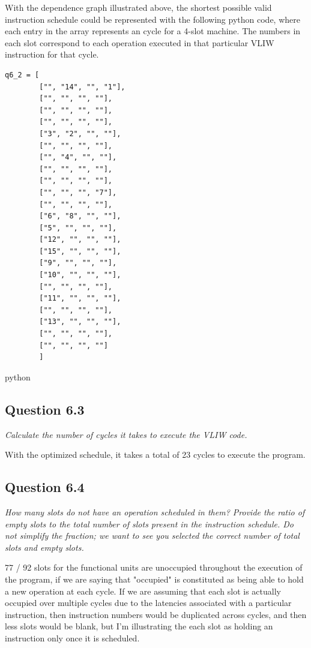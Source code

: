 \documentclass[
	letterpaper, %
]{jdf}
\begin{document}
With the dependence graph illustrated above, the shortest possible valid instruction schedule could be represented with the following python code, where each entry in the array represents an cycle for a 4-slot machine. The numbers in each slot correspond to each operation executed in that particular VLIW instruction for that cycle.

\begin{verbatim}
q6_2 = [
        ["", "14", "", "1"],
        ["", "", "", ""],
        ["", "", "", ""],
        ["", "", "", ""],
        ["3", "2", "", ""],
        ["", "", "", ""],
        ["", "4", "", ""],
        ["", "", "", ""],
        ["", "", "", ""],
        ["", "", "", "7"],
        ["", "", "", ""],
        ["6", "8", "", ""],
        ["5", "", "", ""],
        ["12", "", "", ""],
        ["15", "", "", ""],
        ["9", "", "", ""],
        ["10", "", "", ""],
        ["", "", "", ""],
        ["11", "", "", ""],
        ["", "", "", ""],
        ["13", "", "", ""],
        ["", "", "", ""],
        ["", "", "", ""]
        ]
\end{verbatim}{python}
\subsection{Question 6.3}
\textit{Calculate the number of cycles it takes to execute the VLIW code.}

With the optimized schedule, it takes a total of 23 cycles to execute the program.


\subsection{Question 6.4}
\textit{How many slots do not have an operation scheduled in them? Provide the ratio of empty slots to the total number of slots present in the instruction schedule. Do not simplify the fraction; we want to see you selected the correct number of total slots and empty slots.}

77 / 92 slots for the functional units are unoccupied throughout the execution of the program, if we are saying that "occupied" is constituted as being able to hold a new operation at each cycle. If we are assuming that each slot is actually occupied over multiple cycles due to the latencies associated with a particular instruction, then instruction numbers would be duplicated across cycles, and then less slots would be blank, but I'm illustrating the each slot as holding an instruction only once it is scheduled.
\end{document}
